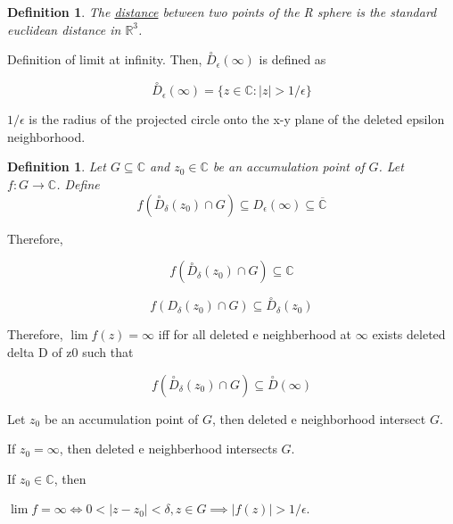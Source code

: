 \documentclass{article}
\newtheorem{definition}[theorem]{Definition}
\newtheorem{one minute paper}[theorem]{One Minute Paper}
\begin{document}
\begin{definition}
    The \underline{distance} between two points of the R sphere is the standard euclidean distance in $\mathbb{R}^3$.
\end{definition}

Definition of limit at infinity. Then, $\overset{\circ}{D}_{\epsilon}(\infty)$ is defined as 

\begin{equation}
    \overset{\circ}{D}_{\epsilon}(\infty) = \{z \in \mathbb{C}: |z| > 1/\epsilon\}
\end{equation}

$1/\epsilon$ is the radius of the projected circle onto the x-y plane of the deleted epsilon neighborhood. 

\begin{definition}
    Let $G \subseteq \mathbb{C}$ and $z_0 \in \mathbb{C}$ be an accumulation point of $G$. Let $f : G \rightarrow \mathbb{C}$. Define 
    \begin{equation}
        f(\overset{\circ}{D}_{\delta}(z_0) \cap G) \subseteq D_{\epsilon}(\infty) \subseteq \overline{\mathbb{C}}
    \end{equation}
\end{definition}

Therefore, 

\begin{equation}
    f(\overset{\circ}{D}_\delta(z_0) \cap G) \subseteq \mathbb{C}
\end{equation}


\begin{equation}
    f(D_\delta(z_0) \cap G) \subseteq \overset{\circ}{D}_\delta(z_0)
\end{equation}

Therefore, $\lim f(z) = \infty$ iff for all deleted e neighberhood at $\infty$ exists deleted delta D of z0 such that 

\begin{equation}
    f(\overset{\circ}{D}_\delta(z_0) \cap G) \subseteq \overset{\circ}{D}(\infty)
\end{equation}

Let $z_0$ be an accumulation point of $G$, then deleted e neighborhood intersect $G$. 

If $z_0 = \infty$, then deleted e neighberhood intersects $G$. 

If $z_0 \in \mathbb{C}$, then 

$\lim f = \infty \iff 0 < |z - z_0| < \delta, z \in G \implies |f(z)| > 1/\epsilon$. 
\end{document}
